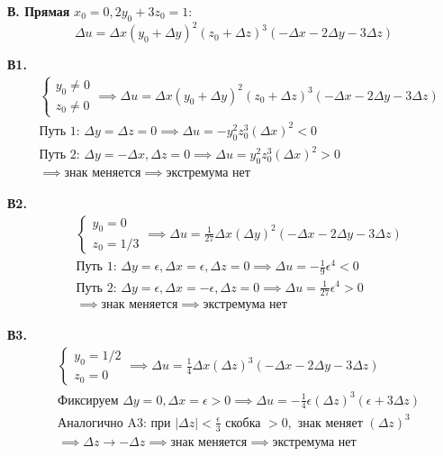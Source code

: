 \documentclass[12pt]{article}
\begin{document}
\vspace{0.5cm}
\noindent \textbf{В. Прямая } \(x_0 = 0, 2y_0 + 3z_0 = 1\):
\[
\Delta u = \Delta x (y_0+\Delta y)^2 (z_0+\Delta z)^3 (-\Delta x - 2\Delta y - 3\Delta z)
\]

\noindent \textbf{В1.}
\begin{align*}
&\begin{cases} y_0 \neq 0 \\ z_0 \neq 0 \end{cases} \implies \Delta u = \Delta x (y_0+\Delta y)^2 (z_0+\Delta z)^3 (-\Delta x - 2\Delta y - 3\Delta z) \\
&\text{Путь 1: } \Delta y = \Delta z = 0 \implies \Delta u = -y_0^2 z_0^3 (\Delta x)^2 < 0 \\
&\text{Путь 2: } \Delta y = -\Delta x, \Delta z = 0 \implies \Delta u = y_0^2 z_0^3 (\Delta x)^2 > 0 \\
&\implies \text{знак меняется} \implies \text{экстремума нет}
\end{align*}

\noindent \textbf{В2.}
\begin{align*}
&\begin{cases} y_0 = 0 \\ z_0 = 1/3 \end{cases} \implies \Delta u = \frac{1}{27} \Delta x (\Delta y)^2 (-\Delta x - 2\Delta y - 3\Delta z) \\
&\text{Путь 1: } \Delta y = \epsilon, \Delta x = \epsilon, \Delta z = 0 \implies \Delta u = -\frac{1}{9}\epsilon^4 < 0 \\
&\text{Путь 2: } \Delta y = \epsilon, \Delta x = -\epsilon, \Delta z = 0 \implies \Delta u = \frac{1}{27}\epsilon^4 > 0 \\
&\implies \text{знак меняется} \implies \text{экстремума нет}
\end{align*}

\noindent \textbf{В3.}
\begin{align*}
&\begin{cases} y_0 = 1/2 \\ z_0 = 0 \end{cases} \implies \Delta u = \frac{1}{4} \Delta x (\Delta z)^3 (-\Delta x - 2\Delta y - 3\Delta z) \\
&\text{Фиксируем } \Delta y = 0, \Delta x = \epsilon > 0 \implies \Delta u = -\frac{1}{4}\epsilon(\Delta z)^3(\epsilon + 3\Delta z) \\
&\text{Аналогично A3: при } |\Delta z| < \frac{\epsilon}{3} \text{ скобка } > 0, \text{ знак меняет } (\Delta z)^3 \\
&\implies \Delta z \to -\Delta z \implies \text{знак меняется} \implies \text{экстремума нет}
\end{align*}
\end{document}
